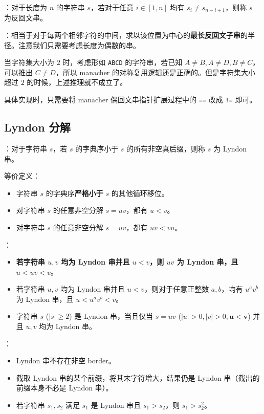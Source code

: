
：对于长度为 $n$ 的字符串 $s$，若对于任意 $i \in [1, n]$ 均有 $s_i \neq s_{n - i + 1}$，则称 $s$ 为反回文串。

：相当于对于每两个相邻字符的中间，求以该位置为中心的\textbf{最长反回文子串}的半径。注意我们只需要考虑长度为偶数的串。

当字符集大小为 $2$ 时，考虑形如 \texttt{ABCD} 的字符串，若已知 $A \neq B, A \neq D, B \neq C$，可以推出 $C\neq D$，所以 manacher 的对称复用逻辑还是正确的。但是字符集大小超过 $2$ 的时候，上述推理就不成立了。

具体实现时，只需要将 manacher 偶回文串指针扩展过程中的 \texttt{==} 改成 \texttt{!=} 即可。

\subsection{Lyndon 分解}

：对于字符串 $s$，若 $s$ 的字典序小于 $s$ 的所有非空真后缀，则称 $s$ 为 Lyndon 串。

等价定义：

\begin{itemize}
    \item 字符串 $s$ 的字典序\textbf{严格小于} $s$ 的其他循环移位。
    \item 对字符串 $s$ 的任意非空分解 $s = uv$，都有 $u < v$。
    \item 对字符串 $s$ 的任意非空分解 $s = uv$，都有 $uv < vu$。
\end{itemize}

：

\begin{itemize}
    \item \textbf{若字符串 $u, v$ 均为 Lyndon 串并且 $u < v$，则 $uv$ 为 Lyndon 串，且 $u < uv < v$}。
    \item 若字符串 $u, v$ 均为 Lyndon 串并且 $u < v$，则对于任意正整数 $a, b$，均有 $u^av^b$ 为 Lyndon 串，且 $u < u^av^b < v$。
    \item 字符串 $s$ ($|s| \geq 2$) 是 Lyndon 串，当且仅当 $s = uv$ ($|u| > 0, |v| > 0, \boldsymbol{u < v}$) 并且 $u, v$ 均为 Lyndon 串。
\end{itemize}

：

\begin{itemize}
    \item Lyndon 串不存在非空 border。
    \item 截取 Lyndon 串的某个前缀，将其末字符增大，结果仍是 Lyndon 串（截出的前缀本身不必是 Lyndon 串）。
    \item 若字符串 $s_1, s_2$ 满足 $s_1$ 是 Lyndon 串且 $s_1 > s_2$，则 $s_1 > s_2^2$。
\end{itemize}

